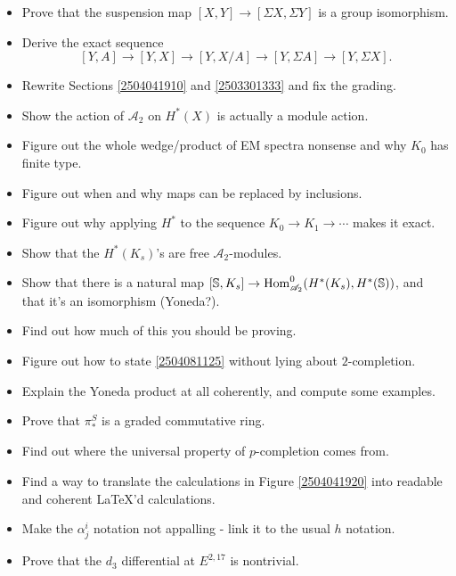\documentclass{MetricNotes2023}
\def\bb{\ensuremath\mathbb}
\def\A{\ensuremath{\mathscr{A}_2}}
\DeclareMathOperator{\Hom}{Hom}
\begin{document}
\begin{itemize}
\item Prove that the suspension map \([X,Y]\to [\Sigma X, \Sigma Y]\) is a group isomorphism. 

\item Derive the exact sequence
\[[Y,A]\to [Y,X]\to [Y, X/A]\to [Y, \Sigma A]\to [Y, \Sigma X].\]

\item Rewrite Sections \ref{2504041910} and \ref{2503301333} and fix the grading.

\item Show the action of \(\A\) on \(H^*(X)\) is actually a module action.

\item Figure out the whole wedge/product of EM spectra nonsense and why \(K_0\) has finite type. 

\item Figure out when and why maps can be replaced by inclusions.

\item Figure out why applying \(H^*\) to the sequence \(K_0\to K_1 \to \cdots\) makes it exact.

\item Show that the \(H^*(K_s)\)'s are free \(\A\)-modules.

\item Show that there is a natural map \([\bb{S}, K_s]\to \Hom^0_{\A}(H^*(K_s), H^*(\bb{S}))\), and that it's an isomorphism (Yoneda?). 

\item Find out how much of this you should be proving.

\item Figure out how to state \ref{2504081125} without lying about \(2\)-completion.

\item Explain the Yoneda product at all coherently, and compute some examples.

\item Prove that \(\pi_*^S\) is a graded commutative ring.

\item Find out where the universal property of \(p\)-completion comes from. 

\item Find a way to translate the calculations in Figure \ref{2504041920} into readable and coherent LaTeX'd calculations.

\item Make the \(\alpha^i_j\) notation not appalling - link it to the usual \(h\) notation.

\item Prove that the \(d_3\) differential at \(E^{2,17}\) is nontrivial.
\end{itemize}
\end{document}
